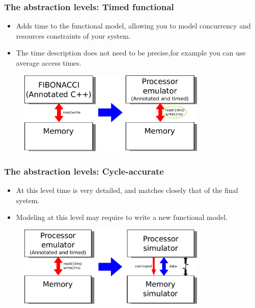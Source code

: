 {\begin{frame}
	\frametitle{The abstraction levels: Timed functional}
	\begin{itemize}
		\item<1-> Adds time to the functional model, allowing you to model concurrency and resources constraints of your system. 
		\item<1-> The time description does not need to be precise,for example you can use average access times.
	\end{itemize}
	\begin{figure}[h]
		\includegraphics[width=0.8\textwidth]{introduction/figures/fibonacci_functional_to_timed_level.pdf}
	\end{figure}
\end{frame}

\begin{frame}
	\frametitle{The abstraction levels: Cycle-accurate}
	\begin{itemize}
		\item<1-> At this level time is very detailed, and matches closely that of the final system.
		\item<1-> Modeling at this level may require to write a new functional model.
	\end{itemize}
	\begin{figure}[h]
		\includegraphics[width=0.8\textwidth]{introduction/figures/fibonacci_timed_to_cycle_level.pdf}
	\end{figure}
\end{frame}

}
